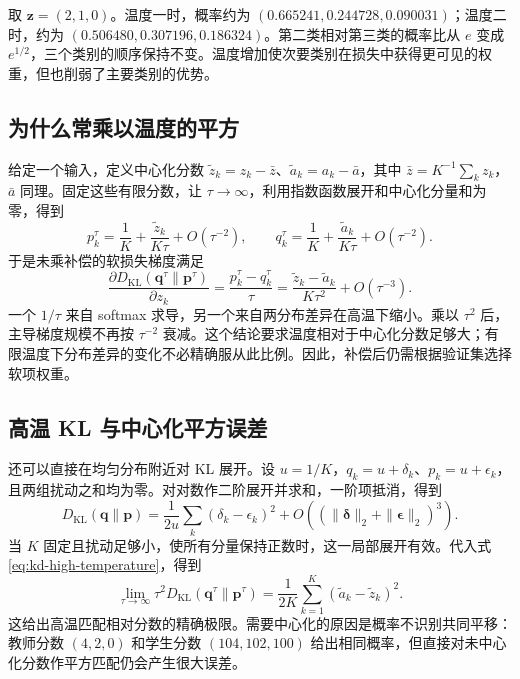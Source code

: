 \documentclass[UTF8,12pt,a4paper,fontset=fandol]{ctexart}
\begin{document}
\begin{example}[温度带来的软化]
取 $\mathbf z=(2,1,0)$。温度一时，概率约为 $(0.665241,0.244728,0.090031)$；温度二时，约为 $(0.506480,0.307196,0.186324)$。第二类相对第三类的概率比从 $e$ 变成 $e^{1/2}$，三个类别的顺序保持不变。温度增加使次要类别在损失中获得更可见的权重，但也削弱了主要类别的优势。
\end{example}

\subsection{为什么常乘以温度的平方}
给定一个输入，定义中心化分数 $\widetilde z_k=z_k-\bar z$、$\widetilde a_k=a_k-\bar a$，其中 $\bar z=K^{-1}\sum_kz_k$，$\bar a$ 同理。固定这些有限分数，让 $\tau\to\infty$，利用指数函数展开和中心化分量和为零，得到
\begin{equation}
 p_k^\tau=\frac1K+\frac{\widetilde z_k}{K\tau}+O(\tau^{-2}),\qquad
 q_k^\tau=\frac1K+\frac{\widetilde a_k}{K\tau}+O(\tau^{-2}).
 \label{eq:kd-high-temperature}
\end{equation}
于是未乘补偿的软损失梯度满足
\begin{equation}
 \frac{\partial D_{\mathrm{KL}}(\mathbf q^\tau\|\mathbf p^\tau)}{\partial z_k}
 =\frac{p_k^\tau-q_k^\tau}{\tau}
 =\frac{\widetilde z_k-\widetilde a_k}{K\tau^2}+O(\tau^{-3}).
 \label{eq:kd-tau-squared}
\end{equation}
一个 $1/\tau$ 来自 softmax 求导，另一个来自两分布差异在高温下缩小。乘以 $\tau^2$ 后，主导梯度规模不再按 $\tau^{-2}$ 衰减。这个结论要求温度相对于中心化分数足够大；有限温度下分布差异的变化不必精确服从此比例。因此，补偿后仍需根据验证集选择软项权重。

\subsection{高温 KL 与中心化平方误差}
还可以直接在均匀分布附近对 KL 展开。设 $u=1/K$，$q_k=u+\delta_k$、$p_k=u+\epsilon_k$，且两组扰动之和均为零。对对数作二阶展开并求和，一阶项抵消，得到
\[
 D_{\mathrm{KL}}(\mathbf q\|\mathbf p)
 =\frac1{2u}\sum_k(\delta_k-\epsilon_k)^2
 +O\!\left((\|\boldsymbol\delta\|_2+\|\boldsymbol\epsilon\|_2)^3\right).
\]
当 $K$ 固定且扰动足够小，使所有分量保持正数时，这一局部展开有效。代入式\eqref{eq:kd-high-temperature}，得到
\begin{equation}
 \lim_{\tau\to\infty}\tau^2D_{\mathrm{KL}}(\mathbf q^\tau\|\mathbf p^\tau)
 =\frac1{2K}\sum_{k=1}^K(\widetilde a_k-\widetilde z_k)^2.
 \label{eq:kd-logit-limit}
\end{equation}
这给出高温匹配相对分数的精确极限。需要中心化的原因是概率不识别共同平移：教师分数 $(4,2,0)$ 和学生分数 $(104,102,100)$ 给出相同概率，但直接对未中心化分数作平方匹配仍会产生很大误差。
\end{document}
